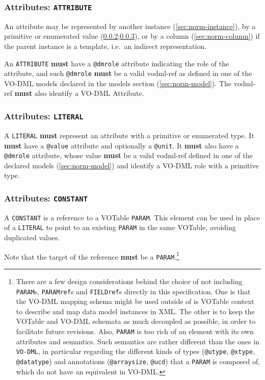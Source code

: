 \documentclass[11pt,a4paper]{ivoa}
\begin{document}
\subsubsection{Attributes: \texttt{ATTRIBUTE}}\label{sec:norm-attribute}

An attribute may be represented by another instance
(\ref{sec:norm-instance}), by a primitive or enumerated value
(\ref{sec:norm-literal};\ref{sec:norm-constant}), or by a column
(\ref{sec:norm-column}) if the parent instance is a template, i.e.~an
indirect representation.

An \texttt{ATTRIBUTE} \textbf{must} have a \texttt{@dmrole} attribute
indicating the role of the attribute, and such \texttt{@dmrole}
\textbf{must} be a valid vodml-ref as defined in one of the VO-DML
models declared in the models section (\ref{sec:norm-model}). The
vodml-ref \textbf{must} also identify a VO-DML Attribute.

\subsubsection{Attributes: \texttt{LITERAL}}\label{sec:norm-literal}

A \texttt{LITERAL} \textbf{must} represent an attribute with a primitive
or enumerated type. It \textbf{must} have a \texttt{@value} attribute
and optionally a \texttt{@unit}. It \textbf{must} also have a
\texttt{@dmrole} attribute, whose value \textbf{must} be a valid
vodml-ref defined in one of the declared models (\ref{sec:norm-model})
and identify a VO-DML role with a primitive type.

\subsubsection{Attributes: \texttt{CONSTANT}}\label{sec:norm-constant}

A \texttt{CONSTANT} is a reference to a VOTable \texttt{PARAM}. This
element can be used in place of a \texttt{LITERAL} to point to an
existing \texttt{PARAM} in the same VOTable, avoiding duplicated values.

Note that the target of the reference \textbf{must} be a
\texttt{PARAM}.\footnote{There are a few design considerations behind
  the choice of not including \texttt{PARAM}s, \texttt{PARAMref}s and
  \texttt{FIELDref}s directly in this specification. One is that the
  VO-DML mapping schema might be used outside of is VOTable context to
  describe and map data model instances in XML. The other is to keep the
  VOTable and VO-DML schemata as much decoupled as possible, in order to
  facilitate future revisions. Also, \texttt{PARAM} is too rich of an
  element with its own attributes and semantics. Such semantics are
  rather different than the ones in \texttt{VO-DML}, in particular
  regarding the different kinds of types (\texttt{@utype},
  \texttt{@xtype}, \texttt{@datatype}) and annotations
  (\texttt{@arraysize}, \texttt{@ucd}) that a \texttt{PARAM} is composed
  of, which do not have an equivalent in VO-DML.}
\end{document}
